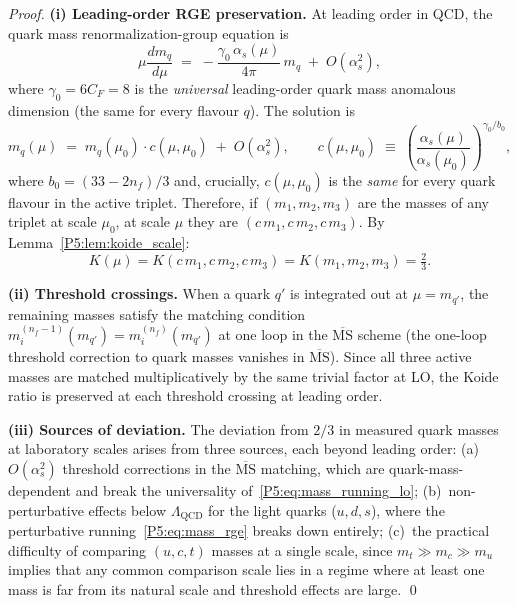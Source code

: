 \documentclass[11pt,a4paper]{article}
\theoremstyle{definition}
\theoremstyle{remark}
\begin{document}
\begin{proof}
\textbf{(i) Leading-order RGE preservation.}
At leading order in QCD, the quark mass renormalization-group equation is
\begin{equation}
  \mu\frac{d m_q}{d\mu}
  \;=\; -\frac{\gamma_0\,\alpha_s(\mu)}{4\pi}\,m_q
  \;+\; O(\alpha_s^2),
  \label{P5:eq:mass_rge}
\end{equation}
where $\gamma_0 = 6C_F = 8$ is the \emph{universal} leading-order quark
mass anomalous dimension (the same for every flavour $q$).
The solution is
\begin{equation}
  m_q(\mu) \;=\; m_q(\mu_0)\cdot c(\mu,\mu_0)
  \;+\; O(\alpha_s^2),
  \qquad
  c(\mu,\mu_0) \;\equiv\;
  \left(\frac{\alpha_s(\mu)}{\alpha_s(\mu_0)}\right)^{\!\gamma_0/b_0},
  \label{P5:eq:mass_running_lo}
\end{equation}
where $b_0=(33-2n_f)/3$ and, crucially, $c(\mu,\mu_0)$ is the
\emph{same} for every quark flavour in the active triplet.
Therefore, if $(m_1,m_2,m_3)$ are the masses of any triplet at
scale $\mu_0$, at scale $\mu$ they are $(c\,m_1,c\,m_2,c\,m_3)$.
By Lemma~\ref{P5:lem:koide_scale}:
\[
  K(\mu) = K(c\,m_1,c\,m_2,c\,m_3) = K(m_1,m_2,m_3) = \tfrac{2}{3}.
\]

\textbf{(ii) Threshold crossings.}
When a quark $q'$ is integrated out at $\mu=m_{q'}$, the remaining
masses satisfy the matching condition
$m_i^{(n_f-1)}(m_{q'})=m_i^{(n_f)}(m_{q'})$
at one loop in the $\overline{\mathrm{MS}}$ scheme (the one-loop
threshold correction to quark masses vanishes in $\overline{\mathrm{MS}}$).
Since all three active masses are matched multiplicatively by the same
trivial factor at LO, the Koide ratio is preserved at each threshold
crossing at leading order.

\textbf{(iii) Sources of deviation.}
The deviation from $2/3$ in measured quark masses at laboratory
scales arises from three sources, each beyond leading order:
(a)~$O(\alpha_s^2)$ threshold corrections in the $\overline{\mathrm{MS}}$
matching, which are quark-mass-dependent and break the universality
of~\eqref{P5:eq:mass_running_lo};
(b)~non-perturbative effects below $\Lambda_{\mathrm{QCD}}$ for the
light quarks ($u,d,s$), where the perturbative running~\eqref{P5:eq:mass_rge}
breaks down entirely;
(c)~the practical difficulty of comparing $(u,c,t)$ masses at a
single scale, since $m_t\gg m_c\gg m_u$ implies that any common
comparison scale lies in a regime where at least one mass is far from
its natural scale and threshold effects are large.
\qed
\end{proof}
\end{document}
